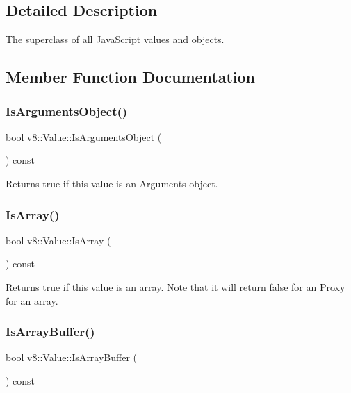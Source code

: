 \subsection{Detailed Description}
The superclass of all Java\+Script values and objects. 

\subsection{Member Function Documentation}
\mbox{\label{classv8_1_1Value_addd71e0247ca7e8055dafdf196542b0b}} 
\subsubsection{\texorpdfstring{Is\+Arguments\+Object()}{IsArgumentsObject()}}
{\footnotesize\ttfamily bool v8\+::\+Value\+::\+Is\+Arguments\+Object (\begin{DoxyParamCaption}{ }\end{DoxyParamCaption}) const}

Returns true if this value is an Arguments object. \mbox{\label{classv8_1_1Value_a4908fac2c2888ade5d05a8dd312e1fd7}} 
\subsubsection{\texorpdfstring{Is\+Array()}{IsArray()}}
{\footnotesize\ttfamily bool v8\+::\+Value\+::\+Is\+Array (\begin{DoxyParamCaption}{ }\end{DoxyParamCaption}) const}

Returns true if this value is an array. Note that it will return false for an \mbox{\hyperlink{classv8_1_1Proxy}{Proxy}} for an array. \mbox{\label{classv8_1_1Value_a62c732277023d09f5e5a54eaa2846853}} 
\subsubsection{\texorpdfstring{Is\+Array\+Buffer()}{IsArrayBuffer()}}
{\footnotesize\ttfamily bool v8\+::\+Value\+::\+Is\+Array\+Buffer (\begin{DoxyParamCaption}{ }\end{DoxyParamCaption}) const}

